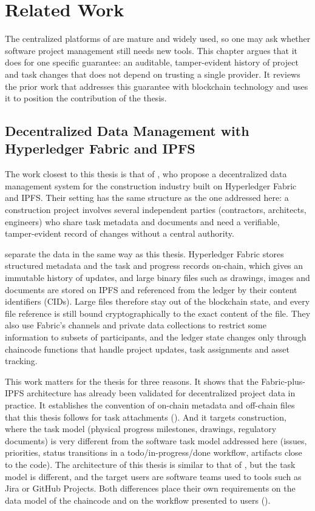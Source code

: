 \chapter{Related Work}
\label{ch:related}

The centralized platforms of  are mature and widely used, so one may ask whether software project management still needs new tools. This chapter argues that it does for one specific guarantee: an auditable, tamper-evident history of project and task changes that does not depend on trusting a single provider. It reviews the prior work that addresses this guarantee with blockchain technology and uses it to position the contribution of the thesis.

\section{Decentralized Data Management with Hyperledger Fabric and IPFS}
\label{sec:adel}

The work closest to this thesis is that of \textcite{adel2023}, who propose a decentralized data management system for the construction industry built on Hyperledger Fabric and IPFS. Their setting has the same structure as the one addressed here: a construction project involves several independent parties (contractors, architects, engineers) who share task metadata and documents and need a verifiable, tamper-evident record of changes without a central authority.

\textcite{adel2023} separate the data in the same way as this thesis. Hyperledger Fabric stores structured metadata and the task and progress records on-chain, which gives an immutable history of updates, and large binary files such as drawings, images and documents are stored on IPFS and referenced from the ledger by their content identifiers (CIDs). Large files therefore stay out of the blockchain state, and every file reference is still bound cryptographically to the exact content of the file. They also use Fabric's channels and private data collections to restrict some information to subsets of participants, and the ledger state changes only through chaincode functions that handle project updates, task assignments and asset tracking.

This work matters for the thesis for three reasons. It shows that the Fabric-plus-IPFS architecture has already been validated for decentralized project data in practice. It establishes the convention of on-chain metadata and off-chain files that this thesis follows for task attachments (). And it targets construction, where the task model (physical progress milestones, drawings, regulatory documents) is very different from the software task model addressed here (issues, priorities, status transitions in a todo/in-progress/done workflow, artifacts close to the code). The architecture of this thesis is similar to that of \citeauthor{adel2023}, but the task model is different, and the target users are software teams used to tools such as Jira or GitHub Projects. Both differences place their own requirements on the data model of the chaincode and on the workflow presented to users ().

